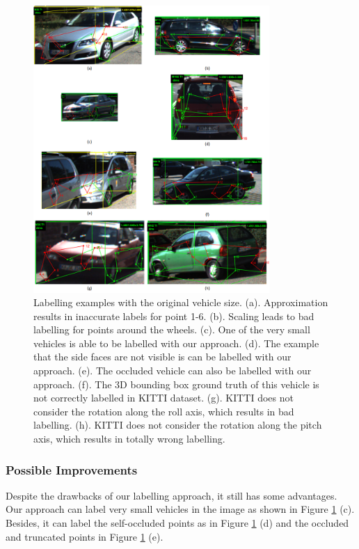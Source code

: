 \documentclass[a4paper,12pt]{article}
\begin{document}
\begin{figure}[H]		
	\includegraphics[width=0.8\textwidth]{label_def.png}
	\caption[Labelling examples of 2D points with the original size.]{Labelling examples with the original vehicle size. (a). Approximation results in inaccurate labels for point 1-6. (b). Scaling leads to bad labelling for points around the wheels. (c). One of the very small vehicles is able to be labelled with our approach. (d). The example that the side faces are not visible is can be labelled with our approach. (e). The occluded vehicle can also be labelled with our approach. (f). The 3D bounding box ground truth of this vehicle is not correctly labelled in KITTI dataset. (g). KITTI does not consider the rotation along the roll axis, which results in bad labelling. (h). KITTI does not consider the rotation along the pitch axis, which results in totally wrong labelling.}
	\centering
	\label{figure:label_def}
\end{figure}

\subsubsection{Possible Improvements}
Despite the drawbacks of our labelling approach, it still has some advantages. Our approach can label very small vehicles in the image as shown in Figure \ref{figure:label_def} (c). Besides, it can label the self-occluded points as in Figure \ref{figure:label_def} (d) and the occluded and truncated points in Figure \ref{figure:label_def} (e). 
\end{document}
